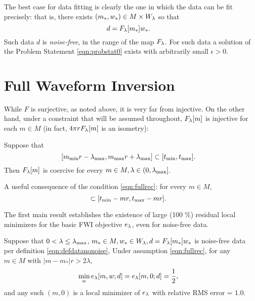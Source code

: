 The best case for data fitting
is clearly the one in which the data can be fit precisely: that is,
there exists $(m_*,w_*) \in M\times W_{\lambda}$ so that
\begin{equation}
  \label{eqn:defdatanonoise}
  d=F_{\lambda}[m_*]w_*.
\end{equation}
Such data $d$ is {\em noise-free}, in the range of the map $F_{\lambda}$. For
such data a solution of the Problem Statement \ref{eqn:probstat0}
exists with arbitrarily small $\epsilon>0$.


\section{Full Waveform Inversion}
While $F$ is surjective, as noted above, it is
very far from injective. On the other hand, under a constraint that
will be assumed throughout, $F_{\lambda}[m]$ is injective for each $m \in M$ (in fact, $4 \pi r
F_{\lambda}[m]$ is an isometry):
\begin{proposition}
  \label{thm:fullrec}
  Suppose that 
  \begin{equation}
    \label{eqn:fullrec}
    [ m_{\rm min}r-\lambda_{\rm max}, m_{\rm max}r+\lambda_{\rm max}]
    \subset [t_{\rm min},t_{\rm max}].
  \end{equation}
  Then $F_{\lambda}[m]$ is coercive for every $m \in M, \lambda \in
  (0,\lambda_{\rm max}]$.
\end{proposition}

 A useful consequence of the condition 
\ref{eqn:fullrec}: for every $m \in M$, 
\begin{equation}
  [-\lambda_{\rm max}, -\lambda_{\rm max}] \subset[ t_{\rm min}-mr , 
  t_{\rm max}-mr]. 
  \label{eqn:zeroinc}
\end{equation}

The first main result establishes the existence of large (100 \%)
residual local minimizers for the basic FWI objective $e_{\lambda}$, even
for noise-free data.
\begin{theorem}
  \label{thm:fwi}
  Suppose that $0 <\lambda\le \lambda_{\rm max}$,  $m_* \in M, w_*
  \in W_{\lambda}, d=F_{\lambda}[m_*]w_*$ is noise-free data per definition \ref{eqn:defdatanonoise},
  Under assumption \ref{eqn:fullrec}, for any $m \in M$ with $|m-m_*|r>2\lambda$,
\begin{equation}
  \label{eqn:isovpm}
 \min_w e_{\lambda}[m,w;d]=e_{\lambda}[m,0;d] = \frac{1}{2},
\end{equation}
and any such $(m,0)$ is a local minimizer of $e_{\lambda}$ with relative RMS
error = 1.0.
\end{theorem}

